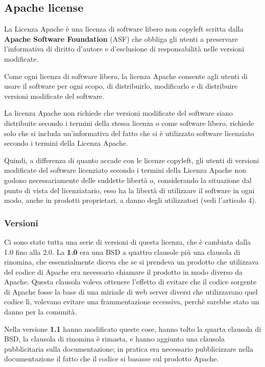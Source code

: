 \subsection{Apache license}

La Licenza Apache è una licenza di software libero non copyleft scritta dalla \textbf{Apache Software Foundation} (ASF) che obbliga gli utenti a preservare l'informativa di diritto d'autore e d'esclusione di responsabilità nelle versioni modificate.

Come ogni licenza di software libero, la licenza Apache consente agli utenti di usare il software per ogni scopo, di distribuirlo, modificarlo e di distribuire versioni modificate del software.

La licenza Apache non richiede che versioni modificate del software siano distribuite secondo i termini della stessa licenza o come software libero, richiede solo che si includa un'informativa del fatto che si è utilizzato software licenziato secondo i termini della Licenza Apache.

Quindi, a differenza di quanto accade con le licenze copyleft, gli utenti di versioni modificate del software licenziato secondo i termini della Licenza Apache non godono necessariamente delle suddette libertà o, considerando la situazione dal punto di vista del licenziatario, esso ha la libertà di utilizzare il software in ogni modo, anche in prodotti proprietari, a danno degli utilizzatori (vedi l'articolo 4).

\subsubsection{Versioni}

Ci sono state tutta una serie di versioni di questa licenza, che è cambiata dalla 1.0 fino alla 2.0. La \textbf{1.0} era una BSD a quattro clausole più una clausola di rinomina, che essenzialmente diceva che se si prendeva un prodotto che utilizzava del codice di Apache era necessario chiamare il prodotto in modo diverso da Apache. Questa clausola voleva ottenere l'effetto di evitare che il codice sorgente di Apache fosse la base di una miriade di web server diversi che utilizzavano quel codice lì, volevano evitare una frammentazione eccessiva, perchè sarebbe stato un danno per la comunità. 

Nella versione \textbf{1.1} hanno modificato queste cose, hanno tolto la quarta clausola di BSD, la clausola di rinomina è rimasta, e hanno aggiunto una clausola pubblicitaria sulla documentazione; in pratica era necessario pubblicizzare nella documentazione il fatto che il codice si basasse sul prodotto Apache. 

